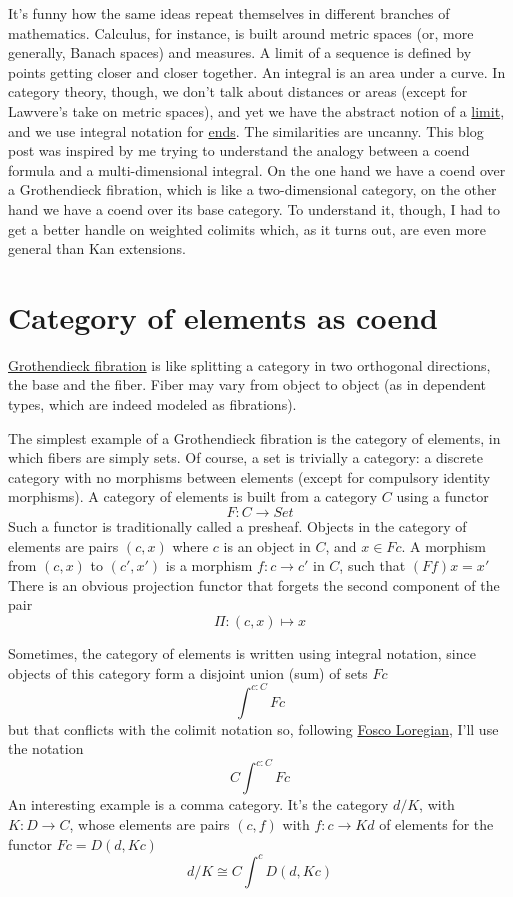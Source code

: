 \documentclass[11pt]{amsart}
\begin{document}
It's funny how the same ideas repeat themselves in different branches of mathematics. Calculus, for instance, is built around metric spaces (or, more generally, Banach spaces) and measures. A limit of a sequence is defined by points getting closer and closer together. An integral is an area under a curve. In category theory, though, we don't talk about distances or areas (except for Lawvere's take on metric spaces), and yet we have the abstract notion of a \href{https://bartoszmilewski.com/2015/04/15/limits-and-colimits/}{limit}, and we use integral notation for \href{https://bartoszmilewski.com/2017/03/29/ends-and-coends/}{ends}. The similarities are uncanny. This blog post was inspired by me trying to understand the analogy between a coend formula and a multi-dimensional integral. On the one hand we have a coend over a Grothendieck fibration, which is like a two-dimensional category, on the other hand we have a coend over its base category. To understand it, though, I had to get a better handle on weighted colimits which, as it turns out, are even more general than Kan extensions. 

\section{Category of elements as coend}

\href{https://bartoszmilewski.com/2019/10/09/fibrations-cleavages-and-lenses/}{Grothendieck fibration} is like splitting a category in two orthogonal directions, the base and the fiber. Fiber may vary from object to object (as in dependent types, which are indeed modeled as fibrations). 

The simplest example of a Grothendieck fibration is the category of elements, in which fibers are simply sets. Of course, a set is trivially a category: a discrete category with no morphisms between elements (except for compulsory identity morphisms). A category of elements is built from a category $C$ using a functor
\[F \colon C \to Set\]
Such a functor is traditionally called a presheaf. Objects in the category of elements are pairs $(c, x)$ where $c$ is an object in $C$, and $x \in F c$. A morphism from $(c, x)$ to $(c', x')$ is a morphism  $f \colon c \to c'$ in $C$, such that $(F f) x = x'$
There is an obvious projection functor that forgets the second component of the pair
\[\Pi \colon (c, x) \mapsto x\]

Sometimes, the category of elements is written using integral notation, since objects of this category form a disjoint union (sum) of sets $F c$
\[\int^{c \colon C} F c\]
but that conflicts with the colimit notation so, following \href{https://arxiv.org/abs/1501.02503}{Fosco Loregian}, I'll use the notation
\[C\int^{c \colon C} F c\]
An interesting example is a comma category. It's the category $d/K$, with $K \colon D \to C$, whose elements are pairs $(c, f)$ with $f \colon c \to K d$
of elements for the functor $F c = D(d, K c)$
\[d/K \cong C\int^c D(d, K c)\]
\end{document}

